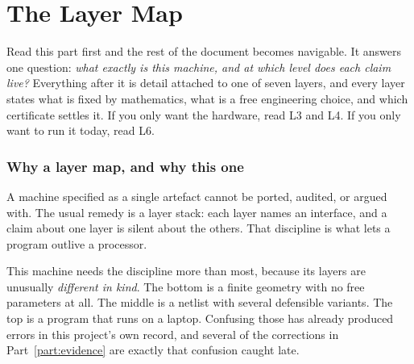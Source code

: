 \makeatletter
{}
\makeatother

\part{The Layer Map}
\label{part:layer-map}

\begin{plainbox}
Read this part first and the rest of the document becomes navigable. It answers one
question: \emph{what exactly is this machine, and at which level does each claim live?}
Everything after it is detail attached to one of seven layers, and every layer states what
is fixed by mathematics, what is a free engineering choice, and which certificate settles
it. If you only want the hardware, read L3 and L4. If you only want to run it today, read
L6.
\end{plainbox}

\section{Why a layer map, and why this one}

A machine specified as a single artefact cannot be ported, audited, or argued with. The
usual remedy is a layer stack: each layer names an interface, and a claim about one layer
is silent about the others. That discipline is what lets a program outlive a processor.

This machine needs the discipline more than most, because its layers are unusually
\emph{different in kind}. The bottom is a finite geometry with no free parameters at all.
The middle is a netlist with several defensible variants. The top is a program that runs on
a laptop. Confusing those has already produced errors in this project's own record, and
several of the corrections in Part~\ref{part:evidence} are exactly that confusion caught
late.

